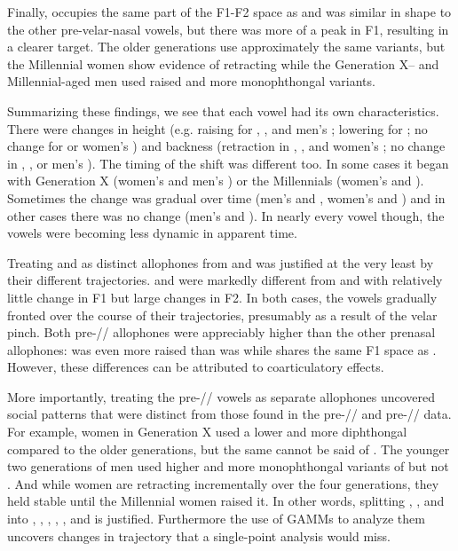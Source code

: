Finally, \bing occupies the same part of the F1-F2 space as \face and  was similar in shape to the other pre-velar-nasal vowels, but there was more of a peak in F1, resulting in a clearer target. The older generations use approximately the same variants, but the Millennial women show evidence of retracting \bing while the Generation X-- and Millennial-aged men used raised and more monophthongal variants.

Summarizing these findings, we see that each vowel had its own characteristics. There were changes in height (e.g. raising for \ban, \bang, and men's \bing; lowering for \ben; no change for \bin or women's \bing) and backness (retraction in \ben, \bin, and women's \bing; no change in \ban, \bang, or men's \bing). The timing of the shift was different too. In some cases it began with Generation X (women's \ban and men's \bing) or the Millennials (women's \ban and \bing). Sometimes the change was gradual over time (men's \ban and \bang, women's \ben and \bin) and in other cases there was no change (men's \ben and \bin). In nearly every vowel though, the vowels were becoming less dynamic in apparent time.

Treating \bing and \bang as distinct allophones from \bin and \ban was justified at the very least by their different trajectories. \bang and \bing were markedly different from \ban and \bin with relatively little change in F1 but large changes in F2. In both cases, the vowels gradually fronted over the course of their trajectories, presumably as a result of the velar pinch. Both pre-// allophones were appreciably higher than the other prenasal allophones: \bang was even more raised than \ban was while \bing shares the same F1 space as \bit. However, these differences can be attributed to coarticulatory effects.

More importantly, treating the pre-// vowels as separate allophones uncovered social patterns that were distinct from those found in the pre-// and pre-// data. For example, women in Generation X used a lower and more diphthongal \ban compared to the older generations, but the same cannot be said of \bang. The younger two generations of men used higher and more monophthongal variants of \bing but not \bin. And while women are retracting \bin incrementally over the four generations, they held \bing stable until the Millennial women raised it. In other words, splitting \trap, \dress, and \kit into \ban, \bang, \ben, \beng, \bin, and \bing is justified. Furthermore the use of GAMMs to analyze them uncovers changes in trajectory that a single-point analysis would miss.






